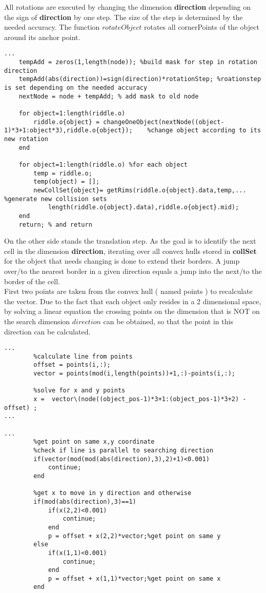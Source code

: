 All rotations are executed by changing the dimension \textbf{direction}  depending on the sign of \textbf{direction} by one step. The size of the step is determined 
by the needed accuracy. The function $rotateObject$ rotates all cornerPoints of the object around its anchor point.\\
\begin{lstlisting}
...
    tempAdd = zeros(1,length(node)); %build mask for step in rotation direction
    tempAdd(abs(direction))=sign(direction)*rotationStep; %roationstep is set depending on the needed accuracy
    nextNode = node + tempAdd; % add mask to old node

    for object=1:length(riddle.o)
        riddle.o{object} = changeOneObject(nextNode((object-1)*3+1:object*3),riddle.o{object});    %change object according to its new rotation
    end
    
    for object=1:length(riddle.o) %for each object 
        temp = riddle.o;
        temp(object) = [];
        newCollSet{object}= getRims(riddle.o{object}.data,temp,... %generate new collision sets
            length(riddle.o{object}.data),riddle.o{object}.mid);
    end
    return; % and return
\end{lstlisting}
On the other side stands the translation step. As the goal is to identify the next cell in the dimension \textbf{direction}, iterating over all convex hulls stored in \textbf{collSet} for the object that needs changing is done to extend their borders. A jump over/to the nearest border in a given direction equals a jump into the next/to the border of the cell.\\
First two points are taken from the convex hull ( named points ) to recalculate the vector. Due to the fact that each object only resides in a 2 dimensional space, by solving a linear equation the crossing points on the dimension that is NOT on the search dimension $direction$ can be obtained, so that the point in this direction can be calculated.
\begin{lstlisting}
...
        %calculate line from points
        offset = points(i,:);
        vector = points(mod(i,length(points))+1,:)-points(i,:);

        %solve for x and y points
        x =  vector\(node((object_pos-1)*3+1:(object_pos-1)*3+2) - offset) ;
...    
    
...        
        %get point on same x,y coordinate
        %check if line is parallel to searching direction
        if(vector(mod(mod(abs(direction),3),2)+1)<0.001)
            continue;
        end

        %get x to move in y direction and otherwise
        if(mod(abs(direction),3)==1)
            if(x(2,2)<0.001)
                continue;
            end
            p = offset + x(2,2)*vector;%get point on same y
        else
            if(x(1,1)<0.001)
                continue;
            end
            p = offset + x(1,1)*vector;%get point on same x
        end
 \end{lstlisting}

